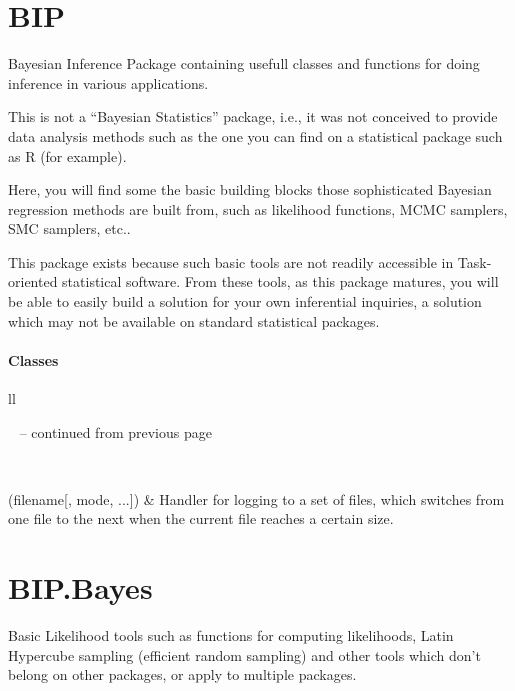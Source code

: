 \documentclass[a4paper,10pt,english]{sphinxmanual}
\begin{document}
\section{BIP}
\label{BIP:module-BIP}\label{BIP::doc}\label{BIP:bip}
Bayesian Inference Package containing usefull classes and functions
for doing inference in various applications.

This is not a ``Bayesian Statistics'' package, i.e., it was not conceived  
to provide data analysis methods such as the one you can find 
on a statistical package such as R (for example).

Here, you will find some the basic building blocks those 
sophisticated Bayesian regression methods are built from, such as 
likelihood functions, MCMC samplers, SMC samplers, etc..

This package exists because such basic tools are not readily accessible 
in Task-oriented statistical software. From these tools, as this package matures,
you will be able to easily build a solution for your own inferential inquiries, 
a solution which may not be available on standard statistical packages.
\paragraph{Classes}

\begin{longtable}{ll}
\hline
\endfirsthead

%
{{\textsf{\tablename\ \thetable{} -- continued from previous page}}} \\
\hline
\endhead

\hline {} \\ \hline
\endfoot

\endlastfoot


(filename{[}, mode, ...{]})
 & 
Handler for logging to a set of files, which switches from one file to the next when the current file reaches a certain size.
\\
\hline\end{longtable}



\section{BIP.Bayes}
\label{BIP.Bayes:module-BIP.Bayes}\label{BIP.Bayes::doc}\label{BIP.Bayes:bip-bayes}
Basic Likelihood tools such as functions for computing likelihoods, Latin Hypercube sampling (efficient random sampling) and other tools which don't belong on other packages, or apply to multiple packages.
\end{document}
